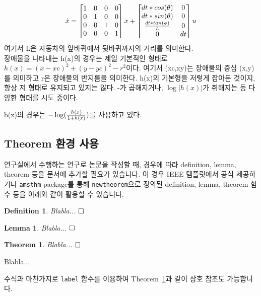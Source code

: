 \documentclass[journal]{IEEEtran}
\newtheorem{theorem}{Theorem}    %
\newtheorem{definition}{Definition} %
\newtheorem{lemma}{Lemma}    %
\begin{document}
	\begin{align}
		\dot{x}=\begin{bmatrix} 1&0&0&0\\0&1&0&0\\0&0&1&0\\0&0&0&1 \end{bmatrix}x+
		\begin{bmatrix} dt*cos(\theta)&0 \\dt*sin(\theta)& 0 \\{dt*tan(\phi) \over L}& 0\\ 0 &dt \end{bmatrix}u
		\label{eq:kinematics}
	\end{align}
	여기서 L은 자동차의 앞바퀴에서 뒷바퀴까지의 거리를 의미한다.  \\
	장애물을 나타내는 h(x)의 경우는 제일 기본적인 형태로 $h(x)=(x-xc)^2+(y-yc)^2-r^2$이다. 여기서 (xc,xy)는 장애물의 중심 (x,y)를 의미하고 r은 장애물의 반지름을 의미한다. h(x)의 기본형을 저렇게 잡아둔 것이지, 항상 저 형태로 유지되고 있지는 않다. -가 곱해지거나, $\log{\lvert h(x) \rvert}$가 취해지는 등 다양한 형태를 시도 중이다.
	
	b(x)의 경우는 $-\log({h(x) \over 1+h(x)})$를 사용하고 있다. 
	
	
	\subsection{Theorem 환경 사용}
	
	연구실에서 수행하는 연구로 논문을 작성할 때, 경우에 따라 definition, lemma, theorem 등을 문서에 추가할 필요가 있습니다. 
	이 경우 IEEE 템플릿에서 공식 제공하거나 {\tt amsthm} package를 통해 {\tt newtheorem}으로 정의된 definition, lemma, theorem 함수 등을 아래와 같이 활용할 수 있습니다. 
	
	\begin{definition}
		Blabla... $\hfill\square$
	\end{definition}
	
	\begin{lemma}
		Blabla... $\hfill\square$
	\end{lemma}
	
	\begin{theorem}\label{thm:Dummy}
		Blabla... $\hfill\square$
	\end{theorem}
	\begin{IEEEproof}
		Blabla...
	\end{IEEEproof}
	
	수식과 마찬가지로 {\tt label} 함수를 이용하여 Theorem~\ref{thm:Dummy}과 같이 상호 참조도 가능합니다.
	
\end{document}
